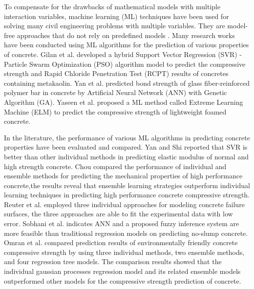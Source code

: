 \documentclass[11pt]{article}
\begin{document}
	
	To compensate for the drawbacks of mathematical models with multiple interaction variables, machine learning (ML) techniques have been used for solving many civil engineering problems with multiple variables. They are model-free approaches that do not rely on predefined models \cite{reuter2018comparative}. Many research works have been conducted using ML algorithms for the prediction of various properties of concrete. Gilan et al.\cite{gilan2012hybrid} developed a hybrid Support Vector Regression (SVR) - Particle Swarm Optimization (PSO) algorithm model to predict the compressive strength and Rapid Chloride Penetration Test (RCPT) results of concretes containing metakaolin. Yan et al. \cite{yan2017evaluation} predicted bond strength of glass fiber-reinforced polymer bar in concrete by Artificial Neural Network (ANN) with Genetic Algorithm (GA). Yaseen et al.\cite{yaseen2018predicting} proposed a ML method called Extreme Learning Machine (ELM) to predict the compressive strength of lightweight foamed concrete. 
	
	In the literature, the performance of various ML algorithms in predicting concrete properties have been evaluated and compared. Yan and Shi \cite{yan2010prediction} reported that SVR is better than other individual methods in predicting elastic modulus of normal and high strength concrete. Chou \cite{chou2014machine} compared the performance of individual and ensemble methods for predicting the mechanical properties of high performance concrete,the results reveal that ensemble learning strategies outperform individual learning techniques in predicting high performance concrete compressive strength. Reuter et al. \cite{reuter2018comparative} employed three individual approaches for modeling concrete failure surfaces, the three approaches are able to fit the experimental data with low error. Sobhani et al. \cite{sobhani2010prediction} indicates ANN and a proposed fuzzy inference system are more feasible than traditional regression models on predicting no-slump concrete. Omran et al. \cite{omran2016comparison} compared prediction results of environmentally friendly concrete compressive strength by using three individual methods, two ensemble methods, and four regression tree models. The comparison results showed that the individual gaussian processes regression model and its related ensemble models outperformed other models for the compressive strength prediction of  concrete.
	
\end{document}
